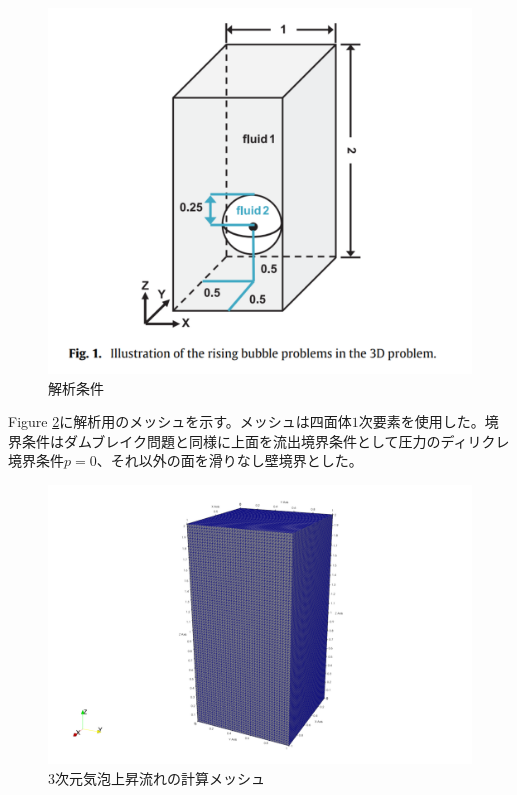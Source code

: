 \begin{figure}[H]
	\centering
	\includegraphics[width=10truecm]{pics/3d-bubble/setting.pdf}
	\caption{解析条件\cite{Safi2017}}
	\label{fig:3d-bubble-setting}
\end{figure}

Figure \ref{fig:3d-bubble-mesh}に解析用のメッシュを示す。メッシュは四面体$1$次要素を使用した。境界条件はダムブレイク問題と同様に上面を流出境界条件として圧力のディリクレ境界条件$p=0$、それ以外の面を滑りなし壁境界とした。

\begin{figure}[H]
	\centering
	\includegraphics[width=10truecm]{pics/3d-bubble/mesh.pdf}
	\caption{3次元気泡上昇流れの計算メッシュ}
	\label{fig:3d-bubble-mesh}
\end{figure}

